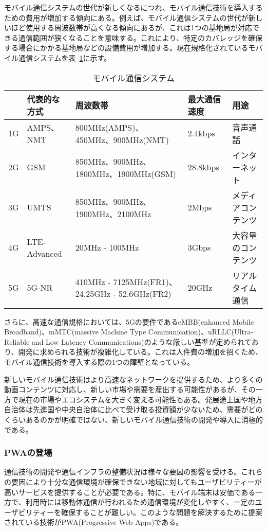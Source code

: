 モバイル通信システムの世代が新しくなるにつれ、モバイル通信技術を導入するための費用が増加する傾向にある。例えば、モバイル通信システムの世代が新しいほど使用する周波数帯が高くなる傾向にあるが、これは1つの基地局が対応できる通信範囲が狭くなることを意味する。これにより、特定のカバレッジを確保する場合にかかる基地局などの設備費用が増加する。現在規格化されているモバイル通信システムを表~\ref{table:モバイル通信システム}に示す。
\begin{table}
    \centering
    \caption{モバイル通信システム}
    \label{table:モバイル通信システム}
    \begin{tabular}{|p{3em}|p{10em}|p{12em}|p{5em}|p{10em}|}
         \hline
         & 代表的な方式 & 周波数帯 & 最大通信速度 & 用途 \\ \hline
         1G & AMPS、NMT & 800MHz(AMPS)、450MHz、900MHz(NMT) & 2.4kbps & 音声通話 \\ \hline
         2G & GSM & 850MHz、900MHz、1800MHz、1900MHz(GSM) & 28.8kbps & インターネット \\ \hline
         3G & UMTS & 850MHz、900MHz、1900MHz、2100MHz & 2Mbps & メディアコンテンツ \\ \hline
         4G & LTE-Advanced & 20MHz - 100MHz & 3Gbps & 大容量のコンテンツ \\ \hline
         5G & 5G-NR & 410MHz - 7125MHz(FR1)、24.25GHz - 52.6GHz(FR2) & 20GHz & リアルタイム通信 \\ \hline
    \end{tabular}
\end{table}

さらに、高速な通信規格においては、5Gの要件であるeMBB(enhanced Mobile Broadband)、mMTC(massive Machine Type Communication)、uRLLC(Ultra-Reliable and Low Latency Communications)のような厳しい基準が定められており、開発に求められる技術が複雑化している。これは人件費の増加を招くため、モバイル通信技術を導入する際の1つの障壁となっている。

新しいモバイル通信技術はより高速なネットワークを提供するため、より多くの動画コンテンツに対応し、新しい市場や需要を産出する可能性があるが、その一方で現在の市場やエコシステムを大きく変える可能性もある。発展途上国や地方自治体は先進国や中央自治体に比べて受け取る投資額が少ないため、需要がどのくらいあるのかが明確ではない、新しいモバイル通信技術の開発や導入に消極的である。
\subsubsection{PWAの登場}
\label{subsubsection:PWAの登場}
通信技術の開発や通信インフラの整備状況は様々な要因の影響を受ける。これらの要因により十分な通信環境が確保できない地域に対してもユーザビリティーが高いサービスを提供することが必要である。特に、モバイル端末は安価である一方で、利用時には移動体通信が行われるため通信環境が変化しやすく、一定のユーザビリティーを確保することが難しい。このような問題を解決するために提案されている技術がPWA(Progressive Web Apps)である。

